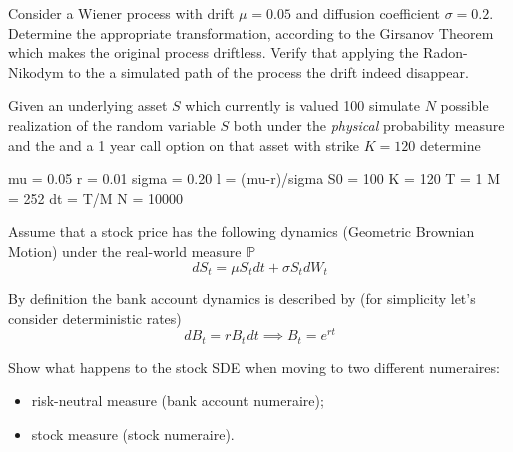 \documentclass[12pt,a4paper]{book}
\begin{document}
\begin{exercise}
Consider a Wiener process with drift $\mu=0.05$ and diffusion coefficient $\sigma=0.2$. Determine the appropriate transformation, according to the Girsanov Theorem which makes the original process driftless. Verify that applying the Radon-Nikodym to the a simulated path of the process the drift indeed disappear.

\end{exercise}

\begin{exercise}
Given an underlying asset $S$ which currently is valued 100 simulate $N$ possible realization of the random variable $S$ both under the \emph{physical} probability measure and the 
and a 1 year call option on that asset with strike $K=120$ determine 


mu = 0.05
r = 0.01
sigma = 0.20
l = (mu-r)/sigma
S0 = 100
K = 120
T = 1
M = 252
dt = T/M
N = 10000
\end{exercise}

\begin{exercise}[subtitle=Moving Away from $\mathbb{P}$ Measure]
Assume that a stock price has the following dynamics (Geometric Brownian Motion) under the real-world measure $\mathbb{P}$
\begin{equation*}
dS_t = \mu S_t dt + \sigma S_t dW_t
\end{equation*}

By definition the bank account dynamics is described by (for simplicity let's consider deterministic rates)
\begin{equation*}
dB_t = rB_tdt\implies B_t = e^{rt}
\end{equation*}

Show what happens to the stock SDE when moving to two different numeraires:
\begin{itemize}
\item risk-neutral measure (bank account numeraire);
\item stock measure (stock numeraire).
\end{itemize}
\end{exercise}
\end{document}

